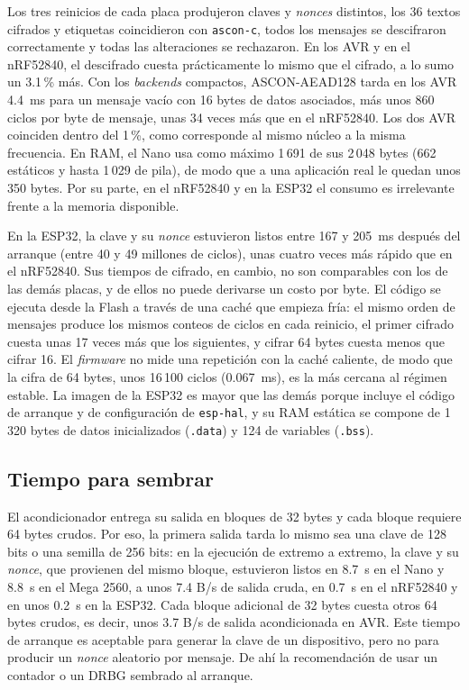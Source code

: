 Los tres reinicios de cada placa produjeron claves y \textit{nonces} distintos, los 36 textos cifrados y etiquetas coincidieron con \texttt{ascon-c}, todos los mensajes se descifraron correctamente y todas las alteraciones se rechazaron. En los AVR y en el nRF52840, el descifrado cuesta prácticamente lo mismo que el cifrado, a lo sumo un 3.1\,\% más. Con los \textit{backends} compactos, ASCON-AEAD128 tarda en los AVR 4.4~ms para un mensaje vacío con 16 bytes de datos asociados, más unos 860 ciclos por byte de mensaje, unas 34 veces más que en el nRF52840. Los dos AVR coinciden dentro del 1\,\%, como corresponde al mismo núcleo a la misma frecuencia. En RAM, el Nano usa como máximo 1\,691 de sus 2\,048 bytes (662 estáticos y hasta 1\,029 de pila), de modo que a una aplicación real le quedan unos 350 bytes. Por su parte, en el nRF52840 y en la ESP32 el consumo es irrelevante frente a la memoria disponible.

En la ESP32, la clave y su \textit{nonce} estuvieron listos entre 167 y 205~ms después del arranque (entre 40 y 49 millones de ciclos), unas cuatro veces más rápido que en el nRF52840. Sus tiempos de cifrado, en cambio, no son comparables con los de las demás placas, y de ellos no puede derivarse un costo por byte. El código se ejecuta desde la Flash a través de una caché que empieza fría: el mismo orden de mensajes produce los mismos conteos de ciclos en cada reinicio, el primer cifrado cuesta unas 17 veces más que los siguientes, y cifrar 64 bytes cuesta menos que cifrar 16. El \textit{firmware} no mide una repetición con la caché caliente, de modo que la cifra de 64 bytes, unos 16\,100 ciclos (0.067~ms), es la más cercana al régimen estable. La imagen de la ESP32 es mayor que las demás porque incluye el código de arranque y de configuración de \texttt{esp-hal}, y su RAM estática se compone de 1\,320 bytes de datos inicializados (\texttt{.data}) y 124 de variables (\texttt{.bss}).

\subsection{Tiempo para sembrar}

El acondicionador entrega su salida en bloques de 32 bytes y cada bloque requiere 64 bytes crudos. Por eso, la primera salida tarda lo mismo sea una clave de 128 bits o una semilla de 256 bits: en la ejecución de extremo a extremo, la clave y su \textit{nonce}, que provienen del mismo bloque, estuvieron listos en 8.7~s en el Nano y 8.8~s en el Mega 2560, a unos 7.4 B/s de salida cruda, en 0.7~s en el nRF52840 y en unos 0.2~s en la ESP32. Cada bloque adicional de 32 bytes cuesta otros 64 bytes crudos, es decir, unos 3.7 B/s de salida acondicionada en AVR. Este tiempo de arranque es aceptable para generar la clave de un dispositivo, pero no para producir un \textit{nonce} aleatorio por mensaje. De ahí la recomendación de usar un contador o un DRBG sembrado al arranque.

